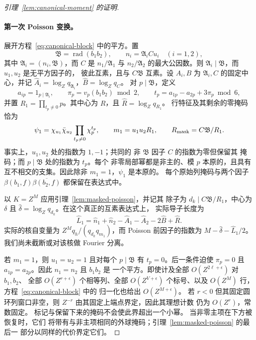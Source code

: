 \documentclass[11pt,a4paper]{article}
\numberwithin{equation}{section}
\numberwithin{figure}{section}
\theoremstyle{definition}
\theoremstyle{remark}
\begin{document}
\begin{proof}[引理~\ref{lem:canonical-moment} 的证明]
\paragraph{第一次 Poisson 变换。}
展开方程~\eqref{eq:canonical-block} 中的平方。置
\[
 \mathfrak B=\operatorname{rad}(b_1b_2),\qquad
 n_i=\mathfrak A_i C u_i\quad(i=1,2),
\]
其中 \(\mathfrak A_i=(n_i,\mathfrak B)\)，而 \(C\) 是
\(n_1/\mathfrak A_1\) 与 \(n_2/\mathfrak A_2\) 的最大公因数。则
\(\mathfrak A_i\mid\mathfrak B\)，而 \(u_1,u_2\) 是无平方因子的，
彼此互素，且与 \(C\mathfrak B\) 互素。设 \(A_i,B\)
为 \(\mathfrak A_i,C\) 的固定中心，并记
\(\widehat A_i=\log_Zq_{\mathfrak A_i}\)，\(\widehat B=\log_Zq_C\)。
对 \(p\mid\mathfrak B\)，定义
\[
 a_{ip}=1_{p\mid\mathfrak A_i},\qquad
 \pi_p=v_p(b_1b_2)\bmod2,\qquad
 t_p=a_{1p}-a_{2p}+3\pi_p\bmod6,
\]
并置 \(R_1=\prod_{t_p\ne0}p\)。其中心为 \(R\)，且
\(\widehat R=\log_Zq_{R_1}\)。
行特征及其剩余的零掩码恰为
\begin{equation}\label{eq:first-masked-data}
 \psi_1=\chi_{u_1}\bar\chi_{u_2}
               \prod_{t_p\ne0}\chi_p^{t_p},\qquad
 m_1=u_1u_2R_1,\qquad
 R_{\rm mask}=C\mathfrak B/R_1.
\end{equation}
事实上，\(u_1,u_2\) 处的指数为 \(1,-1\)；共同的
非 \(\mathfrak B\) 因子 \(C\) 的指数为零但保留其
掩码；而 \(p\mid\mathfrak B\) 处的指数为 \(t_p\)。每个
非零局部幂都是非主的、模 \(p\) 本原的，且具有
互不相交的支集。因此除非 \(m_1=1\)，\(\psi_1\) 是本原的。
每个原始列掩码与两个因子
\(\beta(b_1,f)\overline{\beta(b_2,f)}\) 都保留在表达式中。

以 \(K=Z^M\) 应用引理~\ref{lem:masked-poisson}，并记其
除子为 \(d_k\mid C\mathfrak B/R_1\)，中心为 \(\delta\) 且
\(\widehat\delta=\log_Zq_{d_k}\)。在这个真正的互素表达式上，
实际导子长度为
\begin{equation}\label{eq:first-poisson-lengths}
 \widehat L_1=\widehat n_1+\widehat n_2-\widehat A_1-\widehat A_2
                    -2\widehat B+\widehat R.
\end{equation}
实际的核自变量为 \(Z^Mq_h/(q_{d_k}q_{m_1})\)，而
Poisson 前因子的指数为 \(M-\widehat\delta-\widehat L_1/2\)。
我们尚未截断或对该核做 Fourier 分离。

若 \(m_1=1\)，则 \(u_1=u_2=1\) 且对每个
\(p\mid\mathfrak B\) 有 \(t_p=0\)。后一条件迫使 \(\pi_p=0\)
且 \(a_{1p}=a_{2p}\)。因此 \(n_1=n_2\) 且 \(b_1b_2\) 是
一个平方。即使计及全部 \(O(Z^{2\ell+\epsilon})\) 对 \(b_1,b_2\)、
全部 \(O(Z^{r+\epsilon})\) 个相等列、全部 \(O(Z^{V+\epsilon})\)
个标号、以及 \(O(Z^M)\) 行，方程~\eqref{eq:canonical-block} 中的
归一化也给出 \(O(Z^{M+\epsilon})\)。
若 \(r<0\) 但其固定圆环列窗口非空，则
\(Z^{-r}\) 由其固定上端点界定，因此其理想计数
仍为 \(O(Z^r)\)，常数固定。
标记与保留下来的掩码不会使此界超出一个小幂。
当非零主项在下方被恢复时，它们
将带有与非主项相同的外球掩码；引理~\ref{lem:masked-poisson} 的最后一
部分以同样的代价界定它们。


\end{proof}
\end{document}

